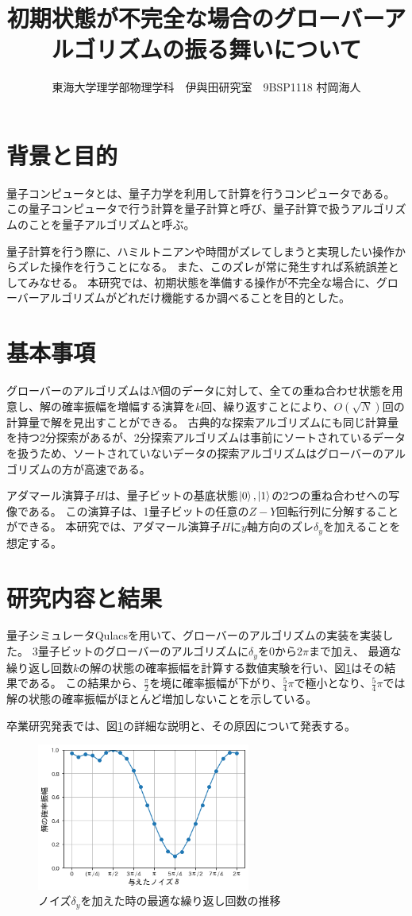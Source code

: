 \documentclass[platex,dvipdfmx, twocolumn]{jsarticle}			%
\title{初期状態が不完全な場合のグローバーアルゴリズムの振る舞いについて}
\author{東海大学理学部物理学科　伊與田研究室　9BSP1118 村岡海人}
\begin{document}
\maketitle
\section{背景と目的}
量子コンピュータとは、量子力学を利用して計算を行うコンピュータである。
この量子コンピュータで行う計算を量子計算と呼び、量子計算で扱うアルゴリズムのことを量子アルゴリズムと呼ぶ。

量子計算を行う際に、ハミルトニアンや時間がズレてしまうと実現したい操作からズレた操作を行うことになる。
また、このズレが常に発生すれば系統誤差としてみなせる。
本研究では、初期状態を準備する操作が不完全な場合に、グローバーアルゴリズムがどれだけ機能するか調べることを目的とした。

\section{基本事項}
グローバーのアルゴリズムは$N個$のデータに対して、全ての重ね合わせ状態を用意し、解の確率振幅を増幅する演算を$k$回、繰り返すことにより、$O(\sqrt{N})$回の計算量で解を見出すことができる。
古典的な探索アルゴリズムにも同じ計算量を持つ2分探索があるが、2分探索アルゴリズムは事前にソートされているデータを扱うため、ソートされていないデータの探索アルゴリズムはグローバーのアルゴリズムの方が高速である。
\cite{QuantumDojo}

アダマール演算子$H$は、量子ビットの基底状態$\ket{0},\ket{1}$の2つの重ね合わせへの写像である。
この演算子は、1量子ビットの任意の$Z-Y$回転行列に分解することができる。
本研究では、アダマール演算子$H$に$y$軸方向のズレ$\delta_y$を加えることを想定する。
\cite{BasicQuantumComputer}

\section{研究内容と結果}
量子シミュレータQulacsを用いて、グローバーのアルゴリズムの実装を実装した。
3量子ビットのグローバーのアルゴリズムに$\delta_y$を$0$から$2\pi$まで加え、
最適な繰り返し回数$k$の解の状態の確率振幅を計算する数値実験を行い、図\ref{fig:P(k)}はその結果である。
この結果から、$\frac{\pi}{2}$を境に確率振幅が下がり、$\frac{5}{4}\pi$で極小となり、$\frac{5}{4}\pi$では解の状態の確率振幅がほとんど増加しないことを示している。

卒業研究発表では、図\ref{fig:P(k)}の詳細な説明と、その原因について発表する。

\begin{figure}
\centering
\includegraphics[width=70mm]{figures/sample.png}
\caption{ノイズ$\delta_y$を加えた時の最適な繰り返し回数の推移}
\label{fig:P(k)}
\end{figure}



\end{document}
